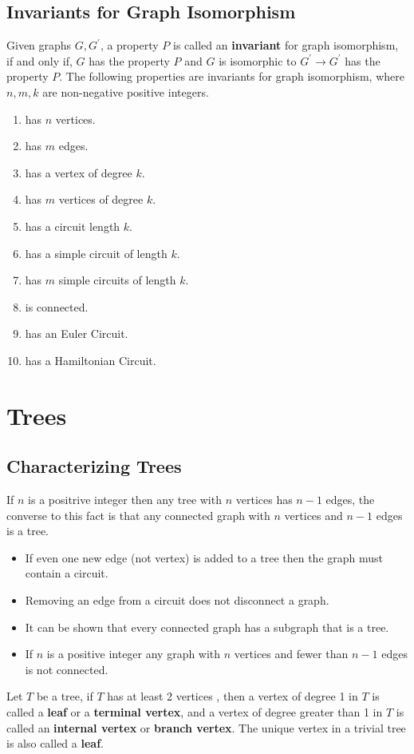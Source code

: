 \documentclass[a4paper]{article}
\begin{document}
  \subsection{Invariants for Graph Isomorphism}
  Given graphs $G,G^\prime$, a property $P$ is called an \textbf{invariant} for graph isomorphism, if and only if, $G$ has the property $P$ and $G$ is isomorphic to $G^\prime \rightarrow G^\prime$ has the property $P$. The following properties are invariants for graph isomorphism, where $n,m,k$ are non-negative positive integers.
  \begin{multicols}{2}
   \begin{enumerate}
    \item has $n$ vertices.
    \item has $m$ edges.
    \item has a vertex of degree $k$.
    \item has $m$ vertices of degree $k$.
    \item has a circuit length $k$.
    \item has a simple circuit of length $k$.
    \item has $m$ simple circuits of length $k$.
    \item is connected.
    \item has an Euler Circuit.
    \item has a Hamiltonian Circuit.
   \end{enumerate} 
  \end{multicols}
  \newpage
  \section{Trees} 
  \subsection{Characterizing Trees}
  If $n$ is a positrive integer then any tree with $n$ vertices has $n-1$ edges, the converse to this fact is that any connected graph with $n$ vertices and $n-1$ edges is a tree.
  \begin{itemize}
    \item If even one new edge (not vertex) is added to a tree then the graph must contain a circuit.
    \item Removing an edge from a circuit does not disconnect a graph.
    \item It can be shown that every connected graph has a subgraph that is a tree.
    \item If $n$ is a positive integer any graph with $n$ vertices and fewer than $n-1$ edges is not connected.
  \end{itemize}
  Let $T$ be a tree, if $T$ has at least 2 vertices , then a vertex of degree 1 in $T$ is called a \textbf{leaf} or a \textbf{terminal vertex}, and a vertex of degree greater than 1 in $T$ is called an \textbf{internal vertex} or \textbf{branch vertex}. The unique vertex in a trivial tree is also called a \textbf{leaf}.
\end{document}
